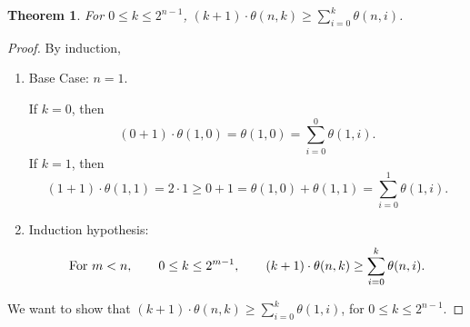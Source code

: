 \documentclass[12pt]{ucthesis}
\theoremstyle{plain}
\newtheorem{theorem}{Theorem}
\theoremstyle{definition}
\begin{document}
\begin{theorem}
\label{Theorem 2}
For $0 \le k \le 2^{n - 1}$,
$(k + 1) \cdot \theta(n, k) \ge \sum_{i = 0}^k \theta(n, i)$.
\end{theorem}
\begin{proof}
By induction,
\begin{enumerate}[(1)]
\item Base Case: $n = 1$.

	If $k = 0$, then
	\begin{equation*}
	(0 + 1) \cdot \theta(1, 0) = \theta(1, 0) = \sum_{i = 0}^0 \theta(1, i).
	\end{equation*}
	If $k = 1$, then
	\begin{equation*}
	(1 + 1) \cdot \theta(1, 1) = 2 \cdot 1 \ge
	0 + 1 = \theta(1, 0) + \theta(1, 1) = \sum_{i = 0}^1 \theta(1, i).
	\end{equation*}
\item Induction hypothesis:
	\begin{equation}
	\label{Equation 4.4}
	\textnormal{For } m < n, \qquad 0 \le k \le 2^{m - 1}, \qquad
	(k + 1) \cdot \theta(n, k) \ge \sum_{i = 0}^k \theta(n, i).
	\end{equation}
\end{enumerate}

We want to show that $(k + 1) \cdot \theta(n, k) \ge \sum_{i = 0}^k \theta(1, i)$,
for $0 \le k \le 2^{n - 1}$.


\end{proof}
\end{document}
